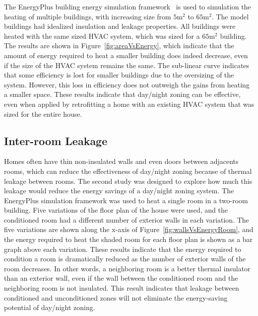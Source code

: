 The EnergyPlus building energy simulation framework~\cite{crawley2004energyplus}
is used to simulation the heating of multiple buildings, with increasing size
from $5 \mathrm{m}^2$ to $65 \mathrm{m}^2$.  The model buildings had idealized
insulation and leakage properties.  All buildings were heated with the same
sized HVAC system, which was sized for a $65 \mathrm{m}^2$ building.  The
results are shown in Figure~\ref{fig:areaVsEnergy}, which indicate that the
amount of energy required to heat a smaller building does indeed decrease, even
if the size of the HVAC system remains the same.  The sub-linear curve indicates
that some efficiency is lost for smaller buildings due to the oversizing of the
system.  However, this loss in efficiency does not outweigh the gains from
heating a smaller space. These results indicate that day/night zoning can be
effective, even when applied by retrofitting a home with an existing HVAC system
that was sized for the entire house.

\subsection{Inter-room Leakage}
\label{subsec:interRoomLeakage}

Homes often have thin non-insulated walls and even doors between adjacents
rooms, which can reduce the effectiveness of day/night zoning because of
thermal leakage between rooms. The second study was designed to explore how much
this leakage would reduce the energy savings of a day/night zoning system. The
EnergyPlus simulation framework was used to heat a single room in a two-room
building. Five variations of the floor plan of the house were used, and the
conditioned room had a different number of exterior walls in each variation.
The five variations are shown along the x-axis of
Figure~\ref{fig:wallsVsEnergyRoom}, and the energy required to heat the shaded
room for each floor plan is shown as a bar graph above each variation.  These
results indicate that the energy required to condition a room is dramatically
reduced as the number of exterior walls of the room decreases.  In other words,
a neighboring room is a better thermal insulator than an exterior wall, even if
the wall between the conditioned room and the neighboring room is not insulated.
This result indicates that leakage between conditioned and unconditioned zones
will not eliminate the energy-saving potential of day/night zoning.

